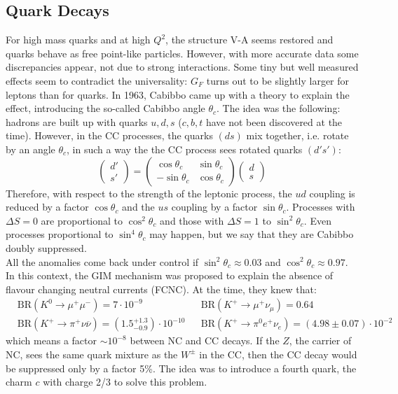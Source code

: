 \documentclass[10.75pt,a4paper,openright,bottom=2cm]{article}
\begin{document}
\subsection{Quark Decays}
For high mass quarks and at high $Q^2$, the structure V-A seems restored and quarks behave as free point-like particles. However, with more accurate data some discrepancies appear, not due to strong interactions. Some tiny but well measured effects seem to contradict the universality: $G_F$ turns out to be slightly larger for leptons than for quarks. In 1963, Cabibbo came up with a theory to explain the effect, introducing the so-called Cabibbo angle $\theta_c$. The idea was the following: hadrons are built up with quarks $u,d,s$ ($c,b,t$ have not been discovered at the time). However, in the CC processes, the quarks $(ds)$ mix together, i.e. rotate by an angle $\theta_c$, in such a way the the CC process sees rotated quarks $(d's')$:
\[
\begin{pmatrix}
    d'\\s'
\end{pmatrix}=\begin{pmatrix}
    \cos\theta_c & \sin\theta_c\\
    -\sin\theta_c & \cos\theta_c
\end{pmatrix}\begin{pmatrix}
    d\\s
\end{pmatrix}
\]
Therefore, with respect to the strength of the leptonic process, the $ud$ coupling is reduced by a factor $\cos\theta_c$ and the $us$ coupling by a factor $\sin\theta_c$. Processes with $\Delta S=0$ are proportional to $\cos^2\theta_c$ and those with $\Delta S=1$ to $\sin^2\theta_c$. Even processes proportional to $\sin^4\theta_c$ may happen, but we say that they are Cabibbo doubly suppressed.\\
All the anomalies come back under control if $\sin^2\theta_c\approx0.03$ and $\cos^2\theta_c\approx0.97$. In this context, the GIM mechanism was proposed to explain the absence of flavour changing neutral currents (FCNC). At the time, they knew that:
\[
\begin{aligned}
&\text{BR}(K^0\to\mu^+\mu^-)=7\cdot10^{-9} &&\text{BR}(K^+\to\mu^+\nu_\mu)=0.64\\
&\text{BR}(K^+\to\pi^+\nu\overline{\nu})=(1.5^{+1.3}_{-0.9})\cdot10^{-10} &&\text{BR}(K^+\to\pi^0e^+\nu_e)=(4.98\pm0.07)\cdot10^{-2}
\end{aligned}
\]
which means a factor $\sim10^{-8}$ between NC and CC decays. If the $Z$, the carrier of NC, sees the same quark mixture as the $W^\pm$ in the CC, then the CC decay would be suppressed only by a factor 5\%. The idea was to introduce a fourth quark, the charm $c$ with charge 2/3 to solve this problem.\\
\end{document}
